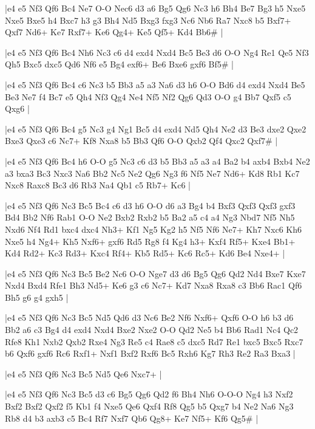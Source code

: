 \whitename{}
\blackname{}
\makegametitle
|e4 e5 Nf3 Qf6 Bc4 Ne7 O-O Nec6 d3 a6 Bg5 Qg6 Nc3 h6 Bh4 Be7 Bg3 h5 Nxe5 Nxe5 Bxe5 h4 Bxc7 h3 g3 Bh4 Nd5 Bxg3 fxg3 Nc6 Nb6 Ra7 Nxc8 b5 Bxf7+ Qxf7 Nd6+ Ke7 Rxf7+ Ke6 Qg4+ Ke5 Qf5+ Kd4 Bb6\#  |

\whitename{}
\blackname{}
\makegametitle
|e4 e5 Nf3 Qf6 Bc4 Nh6 Nc3 c6 d4 exd4 Nxd4 Bc5 Be3 d6 O-O Ng4 Re1 Qe5 Nf3 Qh5 Bxc5 dxc5 Qd6 Nf6 e5 Bg4 exf6+ Be6 Bxe6 gxf6 Bf5\#  |

\whitename{}
\blackname{}
\makegametitle
|e4 e5 Nf3 Qf6 Bc4 c6 Nc3 b5 Bb3 a5 a3 Na6 d3 h6 O-O Bd6 d4 exd4 Nxd4 Be5 Be3 Ne7 f4 Bc7 e5 Qh4 Nf3 Qg4 Ne4 Nf5 Nf2 Qg6 Qd3 O-O g4 Bb7 Qxf5 c5 Qxg6  |

\whitename{}
\blackname{}
\makegametitle
|e4 e5 Nf3 Qf6 Bc4 g5 Nc3 g4 Ng1 Bc5 d4 exd4 Nd5 Qh4 Ne2 d3 Be3 dxe2 Qxe2 Bxe3 Qxe3 c6 Nc7+ Kf8 Nxa8 b5 Bb3 Qf6 O-O Qxb2 Qf4 Qxc2 Qxf7\#  |

\whitename{}
\blackname{}
\makegametitle
|e4 e5 Nf3 Qf6 Bc4 h6 O-O g5 Nc3 c6 d3 b5 Bb3 a5 a3 a4 Ba2 b4 axb4 Bxb4 Ne2 a3 bxa3 Bc3 Nxc3 Na6 Bb2 Nc5 Ne2 Qg6 Ng3 f6 Nf5 Ne7 Nd6+ Kd8 Rb1 Kc7 Nxc8 Raxc8 Bc3 d6 Rb3 Na4 Qb1 c5 Rb7+ Kc6  |

\whitename{}
\blackname{}
\makegametitle
|e4 e5 Nf3 Qf6 Nc3 Bc5 Bc4 c6 d3 h6 O-O d6 a3 Bg4 b4 Bxf3 Qxf3 Qxf3 gxf3 Bd4 Bb2 Nf6 Rab1 O-O Ne2 Bxb2 Rxb2 b5 Ba2 a5 c4 a4 Ng3 Nbd7 Nf5 Nh5 Nxd6 Nf4 Rd1 bxc4 dxc4 Nh3+ Kf1 Ng5 Kg2 h5 Nf5 Nf6 Ne7+ Kh7 Nxc6 Kh6 Nxe5 h4 Ng4+ Kh5 Nxf6+ gxf6 Rd5 Rg8 f4 Kg4 h3+ Kxf4 Rf5+ Kxe4 Bb1+ Kd4 Rd2+ Kc3 Rd3+ Kxc4 Rf4+ Kb5 Rd5+ Kc6 Rc5+ Kd6 Be4 Nxe4+  |

\whitename{}
\blackname{}
\makegametitle
|e4 e5 Nf3 Qf6 Nc3 Bc5 Be2 Nc6 O-O Nge7 d3 d6 Bg5 Qg6 Qd2 Nd4 Bxe7 Kxe7 Nxd4 Bxd4 Rfe1 Bh3 Nd5+ Ke6 g3 c6 Nc7+ Kd7 Nxa8 Rxa8 c3 Bb6 Rac1 Qf6 Bh5 g6 g4 gxh5  |

\whitename{}
\blackname{}
\makegametitle
|e4 e5 Nf3 Qf6 Nc3 Bc5 Nd5 Qd6 d3 Nc6 Be2 Nf6 Nxf6+ Qxf6 O-O h6 b3 d6 Bb2 a6 c3 Bg4 d4 exd4 Nxd4 Bxe2 Nxe2 O-O Qd2 Ne5 b4 Bb6 Rad1 Nc4 Qc2 Rfe8 Kh1 Nxb2 Qxb2 Rxe4 Ng3 Re5 c4 Rae8 c5 dxc5 Rd7 Re1 bxc5 Bxc5 Rxc7 b6 Qxf6 gxf6 Rc6 Rxf1+ Nxf1 Bxf2 Rxf6 Bc5 Rxh6 Kg7 Rh3 Re2 Ra3 Bxa3  |

\whitename{}
\blackname{}
\makegametitle
|e4 e5 Nf3 Qf6 Nc3 Bc5 Nd5 Qe6 Nxc7+  |

\whitename{}
\blackname{}
\makegametitle
|e4 e5 Nf3 Qf6 Nc3 Bc5 d3 c6 Bg5 Qg6 Qd2 f6 Bh4 Nh6 O-O-O Ng4 h3 Nxf2 Bxf2 Bxf2 Qxf2 f5 Kb1 f4 Nxe5 Qe6 Qxf4 Rf8 Qg5 b5 Qxg7 b4 Ne2 Na6 Ng3 Rb8 d4 b3 axb3 c5 Bc4 Rf7 Nxf7 Qb6 Qg8+ Ke7 Nf5+ Kf6 Qg5\#  |

